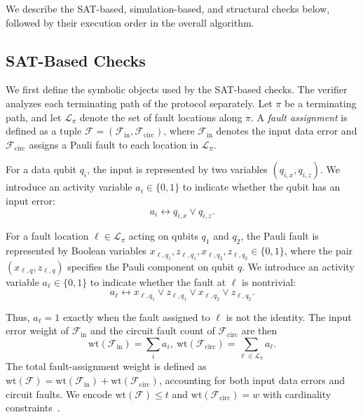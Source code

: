 \documentclass[acmsmall,screen,review,anonymous,nonacm]{acmart}
\begin{document}
We describe the SAT-based, simulation-based, and structural checks
below, followed by their execution order in the overall algorithm.

\subsection{SAT-Based Checks}
\label{subsec:sat-based-checks}


We first define the symbolic objects used by the SAT-based checks.
The verifier analyzes each terminating path of the protocol separately.
Let $\pi$ be a terminating path, and let $\mathcal{L}_\pi$ denote the set of
fault locations along $\pi$. A \emph{fault assignment} is defined as a tuple $\mathcal{F} = (\mathcal{F}_{\mathrm{in}}, \mathcal{F}_{\mathrm{circ}})$, where $\mathcal{F}_{\mathrm{in}}$ denotes the input data error and $\mathcal{F}_{\mathrm{circ}}$ assigns a Pauli fault to each location in $\mathcal{L}_\pi$.

For a data qubit $q_i$, the input is represented by two variables $(q_{i,x}, q_{i,z})$. We introduce an activity variable $a_{i} \in \{0,1\}$ to indicate whether the qubit has an input error:
\begin{equation}
a_{i}
\leftrightarrow
q_{i,x}\vee q_{i,z}.
\end{equation}

For a fault location $\ell\in\mathcal{L}_\pi$ acting on qubits $q_1$ and
$q_2$, the Pauli fault is represented by Boolean variables
$x_{\ell,q_1},z_{\ell,q_1},x_{\ell,q_2},z_{\ell,q_2}\in\{0,1\}$,
where the pair $(x_{\ell,q},z_{\ell,q})$ specifies the Pauli component on
qubit $q$. We introduce an activity variable
$a_\ell\in\{0,1\}$ to indicate whether the fault at $\ell$ is nontrivial:
\begin{equation}
a_\ell
\leftrightarrow
x_{\ell,q_1}\vee z_{\ell,q_1}\vee
x_{\ell,q_2}\vee z_{\ell,q_2}.
\end{equation}

Thus, $a_\ell=1$ exactly when the fault assigned to $\ell$ is not the
identity. The input error weight of $\mathcal{F}_{\mathrm{in}}$ and the circuit fault count of $\mathcal{F}_{\mathrm{circ}}$ are then
\[
\mathrm{wt}(\mathcal{F}_{\mathrm{in}})
=
\sum_{i} a_{i},\  
\mathrm{wt}(\mathcal{F}_{\mathrm{circ}})
=
\sum_{\ell\in\mathcal{L}_\pi} a_\ell.
\]
The total fault-assignment weight is defined as
$\mathrm{wt}(\mathcal F)=\mathrm{wt}(\mathcal F_{\mathrm{in}})
+\mathrm{wt}(\mathcal F_{\mathrm{circ}})$,
accounting for both input data errors and circuit faults.
We encode $\mathrm{wt}(\mathcal{F})\le t$ and
$\mathrm{wt}(\mathcal{F}_{\mathrm{circ}})=w$ with cardinality
constraints~\cite{sinz2005towards}.
\end{document}
